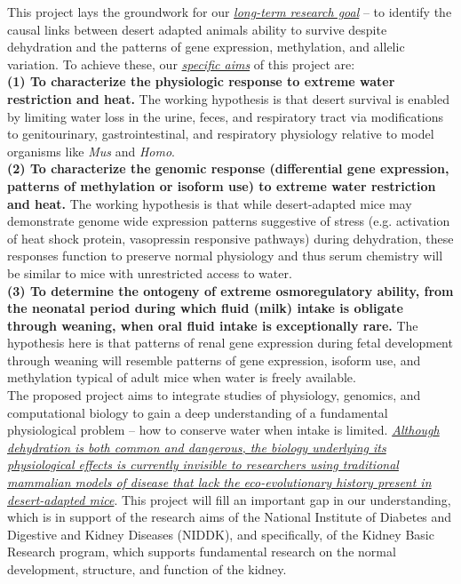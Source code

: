 \noindent  This project lays the groundwork for our \ul{\emph{long-term research goal}} – to identify the causal links between desert adapted animals ability to survive despite dehydration and the patterns of gene expression, methylation, and allelic variation. To achieve these, our \ul{\emph{specific aims}} of this project are:\\

\noindent \textbf{(1) To characterize the physiologic response to extreme water restriction and heat.} The working hypothesis is that desert survival is enabled by limiting water loss in the urine, feces, and respiratory tract via modifications to genitourinary, gastrointestinal, and respiratory physiology relative to model organisms like \textit{Mus} and \textit{Homo}.  \\

\noindent \textbf{(2) To characterize the genomic response (differential gene expression, patterns of methylation or isoform use) to extreme water restriction and heat.} The working hypothesis is that while desert-adapted mice may demonstrate genome wide expression patterns suggestive of stress (e.g. activation of heat shock protein, vasopressin responsive pathways) during dehydration, these responses function to preserve normal physiology and thus serum chemistry will be similar to mice with unrestricted access to water. \\

\noindent \textbf{(3) To determine the ontogeny of extreme osmoregulatory ability, from the neonatal period during which fluid (milk) intake is obligate through weaning, when oral fluid intake is exceptionally rare. } The hypothesis here is that patterns of renal gene expression during fetal development through weaning will resemble patterns of gene expression, isoform use, and methylation typical of adult mice when water is freely available. \\


\noindent The proposed project aims to integrate studies of physiology, genomics, and computational biology to gain a deep understanding of a fundamental physiological problem – how to conserve water when intake is limited. \ul{\emph{Although dehydration is both common and dangerous, the biology underlying its physiological effects is currently invisible to researchers using traditional mammalian models of disease that lack the eco-evolutionary history present in desert-adapted mice}}. This project will fill an important gap in our understanding, which is in support of the research aims of the National Institute of Diabetes and Digestive and Kidney Diseases (NIDDK), and specifically, of the Kidney Basic Research program, which supports fundamental research on the normal development, structure, and function of the kidney.

%
